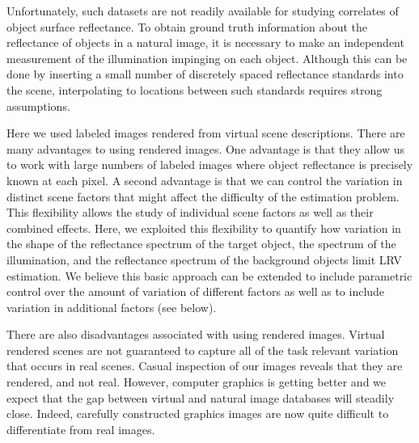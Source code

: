 \documentclass{jov}
\begin{document}
Unfortunately, such datasets are not readily available for studying correlates of object surface reflectance.
To obtain ground truth information about the reflectance of objects in a natural image, it is necessary to make 
an independent measurement of the illumination impinging on each object.
Although this can be done by inserting a small number of discretely spaced reflectance standards into the scene, 
interpolating to locations between such standards requires strong assumptions.

Here we used labeled images rendered from virtual scene descriptions. 
There are many advantages to using rendered images.
One advantage is that they allow us to work with large numbers of labeled images where object reflectance is precisely known at each pixel.
A second advantage is that we can control the variation in distinct scene factors that might affect the difficulty of the estimation problem.
This flexibility allows the study of individual scene factors as well as their combined effects.
Here, we exploited this flexibility to quantify how variation in the shape of the reflectance spectrum of the target object, the spectrum of the illumination, and the reflectance spectrum of the background objects limit LRV estimation.
We believe this basic approach can be extended to include parametric control over the amount of variation of different factors as well as to include variation in additional factors (see below).

There are also disadvantages associated with using rendered images. 
Virtual rendered scenes are not guaranteed to capture all of the task relevant variation that occurs in real scenes.
Casual inspection of our images reveals that they are rendered, and not real.
However, computer graphics is getting better and we expect that the gap between virtual and natural image databases will steadily close.
Indeed, carefully constructed graphics images are now quite difficult to differentiate from real images.
\end{document}
